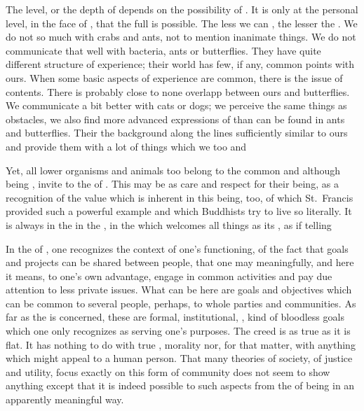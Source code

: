 {\subpa
The level, or the depth of  depends on the possibility of 
. It is only at the personal level, in the face of 
, that the full  is possible. 
The less we can , the lesser the . 
We do not 
 so much with crabs and ants, not to mention inanimate 
things. 
We do not communicate that well with
bacteria, ants or butterflies.  They have quite different structure of
experience; their world has few, if any, common points with ours. 
When some basic aspects of experience are common, there is the issue
 of  contents.  There is probably close
to none overlapp between ours and butterflies.  We communicate a bit
better with cats or dogs; we perceive the same things as obstacles, we
also find more advanced expressions of  than can be found
in ants and butterflies.  Their   the
background along the lines sufficiently similar to ours and provide
them with a lot of things which we too  and

Yet, all lower organisms and animals too belong to the common
 and although being  , invite to the
 of .  This may be  as care
and respect for their being, as a recognition of the value which is
inherent in this being, too, of which St.~Francis provided such a
powerful example and which Buddhists try to live so literally. 
It is always  in the  in the
, in the  which welcomes all things as its
, as if telling 



\pa %
In the  of , one recognizes the
context of one's functioning, of the fact that goals and projects can
be shared between people, that one may meaningfully, and here it
means, to one's own advantage, engage in common activities and pay due
attention to less private issues.  What can be  here are
goals and objectives which can be common to several people, perhaps,
to whole parties and communities.  As far as the  is
concerned, these are formal, institutional, , kind of
bloodless goals which one only recognizes as serving one's purposes. 
The creed  is as true as it is flat.  It has nothing to do with
true , morality nor, for that matter, with anything
which might appeal to a human person.  That many theories of society,
of justice and utility, focus exactly on this form of community does
not seem to show anything except that it is indeed possible to
 such aspects from the  of being in an
apparently meaningful way.

}

